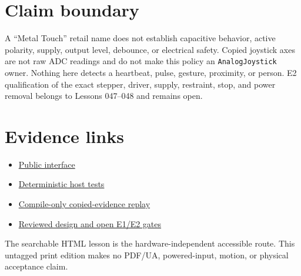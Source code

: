 \documentclass[11pt]{article}
\begin{document}
\section{Claim boundary}
A ``Metal Touch'' retail name does not establish capacitive behavior, active
polarity, supply, output level, debounce, or electrical safety. Copied
joystick axes are not raw ADC readings and do not make this policy an
\texttt{AnalogJoystick} owner. Nothing here detects a heartbeat, pulse,
gesture, proximity, or person. E2 qualification of the exact stepper, driver,
supply, restraint, stop, and power removal belongs to Lessons 047--048 and
remains open.

\section{Evidence links}
\begin{itemize}
 \item \href{https://github.com/spincyc/adk/blob/main/src/interaction_intent_policy.h}
       {Public interface}
 \item \href{https://github.com/spincyc/adk/blob/main/tests/test_interaction_intent_policy.cpp}
       {Deterministic host tests}
 \item \href{https://github.com/spincyc/adk/blob/main/examples/Lesson046InteractionIntent/Lesson046InteractionIntent.ino}
       {Compile-only copied-evidence replay}
 \item \href{https://github.com/spincyc/adk/blob/main/docs/design/LESSONS_046_048_KINETIC_SCULPTURE_PLAN.md}
       {Reviewed design and open E1/E2 gates}
\end{itemize}

The searchable HTML lesson is the hardware-independent accessible route.
This untagged print edition makes no PDF/UA, powered-input, motion, or physical
acceptance claim.
\end{document}
